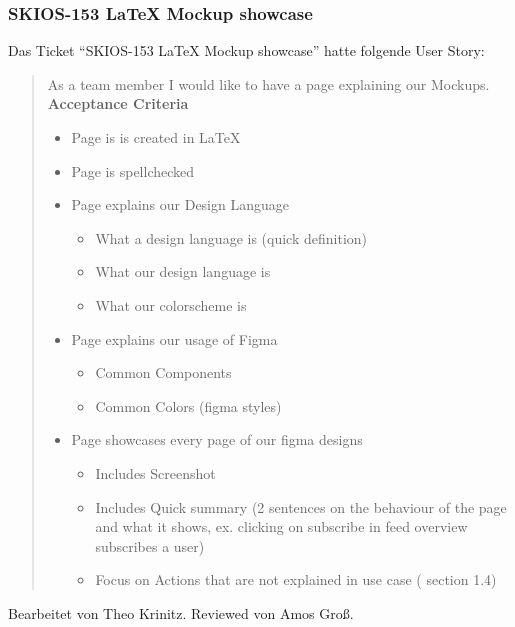 \subsubsection{SKIOS-153 LaTeX Mockup showcase}
Das Ticket \enquote{SKIOS-153 LaTeX Mockup showcase} hatte folgende User Story:
\begin{quotation}
    As a team member I would like to have a page explaining our Mockups. \\
\textbf{Acceptance Criteria}
\begin{itemize}
    \item Page is is created in LaTeX
    \item Page is spellchecked
    \item Page explains our Design Language
    \begin{itemize}
        \item What a design language is (quick definition)
        \item What our design language is
        \item What our colorscheme is
    \end{itemize}
    \item Page explains our usage of Figma
    \begin{itemize}
        \item Common Components
        \item Common Colors (figma styles)
    \end{itemize}
    \item Page showcases every page of our figma designs
    \begin{itemize}
        \item Includes Screenshot
        \item Includes Quick summary (2 sentences on the behaviour of the page and what it shows, ex. clicking on subscribe in feed overview subscribes a user) 
        \item Focus on Actions that are not explained in use case ( section 1.4)
    \end{itemize}
\end{itemize}
\end{quotation}
Bearbeitet von Theo Krinitz.
Reviewed von Amos Groß.

